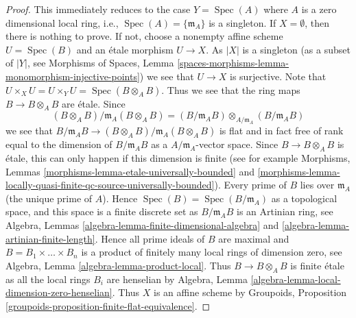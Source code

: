 \documentclass{stacks-project}
\theoremstyle{plain}
\theoremstyle{definition}
\theoremstyle{remark}
\numberwithin{equation}{subsection}
\def\Spec{\mathop{\mathrm{Spec}}}
\begin{document}
\begin{proof}
This immediately reduces to the case $Y = \Spec(A)$ where
$A$ is a zero dimensional local ring, i.e.,
$\Spec(A) = \{\mathfrak m_A\}$
is a singleton. If $X = \emptyset$, then there is nothing to prove.
If not, choose a nonempty affine scheme $U = \Spec(B)$
and an \'etale morphism $U \to X$. As $|X|$ is a singleton (as a
subset of $|Y|$, see
Morphisms of Spaces, Lemma
\ref{spaces-morphisms-lemma-monomorphism-injective-points})
we see that $U \to X$ is surjective. Note that
$U \times_X U = U \times_Y U = \Spec(B \otimes_A B)$.
Thus we see that the ring maps $B \to B \otimes_A B$ are \'etale.
Since
$$
(B \otimes_A B)/\mathfrak m_A(B \otimes_A B)
=
(B/\mathfrak m_AB) \otimes_{A/\mathfrak m_A} (B/\mathfrak m_AB)
$$
we see that
$B/\mathfrak m_AB \to (B \otimes_A B)/\mathfrak m_A(B \otimes_A B)$
is flat and in fact free of rank equal to the dimension of
$B/\mathfrak m_AB$ as a $A/\mathfrak m_A$-vector space. Since
$B \to B \otimes_A B$ is \'etale, this can only happen if this
dimension is finite (see for example
Morphisms, Lemmas \ref{morphisms-lemma-etale-universally-bounded} and
\ref{morphisms-lemma-locally-quasi-finite-qc-source-universally-bounded}).
Every prime of $B$ lies over $\mathfrak m_A$ (the unique prime of $A$).
Hence $\Spec(B) = \Spec(B/\mathfrak m_A)$ as a topological
space, and this space is a finite discrete set as $B/\mathfrak m_A B$
is an Artinian ring, see
Algebra, Lemmas \ref{algebra-lemma-finite-dimensional-algebra} and
\ref{algebra-lemma-artinian-finite-length}.
Hence all prime ideals of $B$ are maximal and
$B = B_1 \times \ldots \times B_n$ is a product of finitely many
local rings of dimension zero, see
Algebra, Lemma \ref{algebra-lemma-product-local}.
Thus $B \to B \otimes_A B$ is finite \'etale as all the local rings
$B_i$ are henselian by
Algebra, Lemma \ref{algebra-lemma-local-dimension-zero-henselian}.
Thus $X$ is an affine scheme by
Groupoids, Proposition \ref{groupoids-proposition-finite-flat-equivalence}.
\end{proof}
\end{document}
